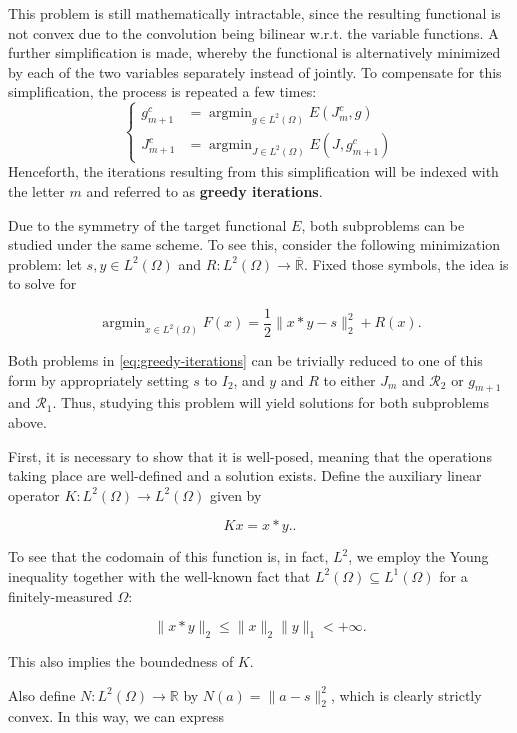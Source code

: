 \documentclass[twocolumn,twoside,a4paper,10pt]{IEEEtran}
\DeclareMathOperator*{\argmin}{\operatorname*{argmin}}
\DeclareMathOperator*{\argmin}{arg\,min}
\begin{document}
This problem is still mathematically intractable, since the resulting functional is not convex due to the convolution being bilinear w.r.t. the variable functions. A further simplification is made, whereby the functional is alternatively minimized by each of the two variables separately instead of jointly. To compensate for this simplification, the process is repeated a few times:
\begin{equation}\label{eq:greedy-iterations}
  \left\{\begin{split}
    g_{m+1}^c &= \argmin_{g\in L^2(\Omega)} E(J_m^c, g) \\
    J_{m+1}^c &= \argmin_{J\in L^2(\Omega)} E(J, g_{m+1}^c)
  \end{split}\right.
\end{equation}
Henceforth, the iterations resulting from this simplification will be indexed with the letter \(m\) and referred to as \textbf{greedy iterations}.

Due to the symmetry of the target functional \(E\), both subproblems can be studied under the same scheme. To see this, consider the following minimization problem: let \(s, y\in L^2(\Omega)\) and \(R\colon L^2(\Omega)\to\overline{\mathbb{R}}\). Fixed those symbols, the idea is to solve for

\[
  \argmin_{x\in L^2(\Omega)}F(x) = \frac12\|x\ast y - s\|_2^2 + R(x)
.\]

Both problems in \cref{eq:greedy-iterations} can be trivially reduced to one of this form by appropriately setting \(s\) to \(I_2\), and \(y\) and \(R\) to either \(J_m\) and \(\mathcal{R}_2\) or \(g_{m+1}\) and \(\mathcal{R}_1\). Thus, studying this problem will yield solutions for both subproblems above.

First, it is necessary to show that it is well-posed, meaning that the operations taking place are well-defined and a solution exists. Define the auxiliary linear operator \(K\colon L^2(\Omega)\to L^2(\Omega)\) given by

\[
  Kx=x\ast y.
.\]

To see that the codomain of this function is, in fact, \(L^2\), we employ the Young inequality together with the well-known fact that \(L^2(\Omega)\subseteq L^1(\Omega)\) for a finitely-measured \(\Omega\):

\[
  \|x\ast y\|_2 \leq \|x\|_{2}\|y\|_{1} < +\infty
.\]

This also implies the boundedness of \(K\).

Also define \(N\colon L^2(\Omega)\to \mathbb{R}\) by \(N(a) = \|a - s\|_{2}^2\), which is clearly strictly convex. In this way, we can express
\end{document}
